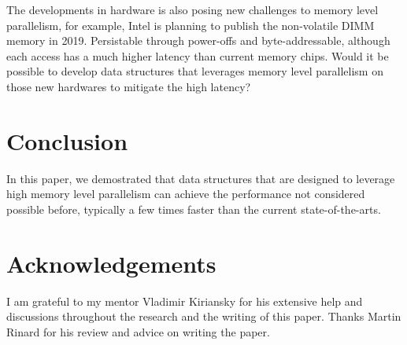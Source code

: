 \documentclass[11pt, usletter]{article}
\begin{document}
The developments in hardware is also posing new challenges to memory level parallelism, 
for example, Intel is planning to publish the non-volatile DIMM memory in 2019.
Persistable through power-offs and byte-addressable, 
although each access has a much higher latency than current memory chips. 
Would it be possible to develop data structures that leverages memory level parallelism 
on those new hardwares to mitigate the high latency? 

\section{Conclusion} \label{conclusion}

In this paper, we demostrated that data structures that are designed to leverage high memory level parallelism 
can achieve the performance not considered possible before, 
typically a few times faster than the current state-of-the-arts. 

\section*{Acknowledgements}

I am grateful to my mentor Vladimir Kiriansky for his extensive help and discussions throughout the research 
and the writing of this paper. Thanks Martin Rinard for his review and advice on writing the paper. 

{}

\end{document}

